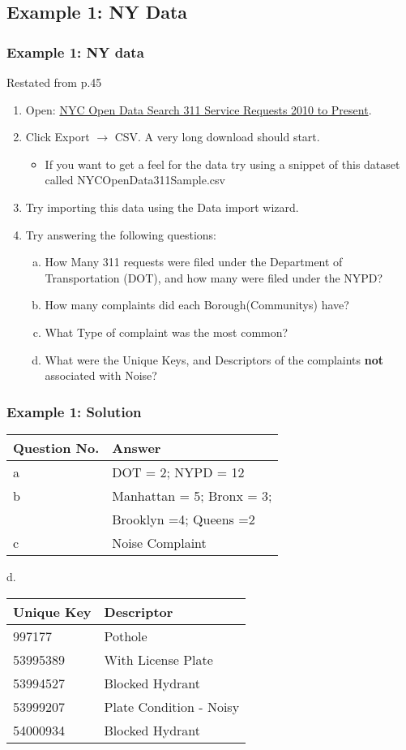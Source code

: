 \documentclass[12pt]{beamer}
\begin{document}
\subsection{Example 1: NY Data}
	\begin{frame}
		\frametitle{Example 1: NY data}
		Restated from p.45 
		\begin{enumerate}
			\item Open: \textcolor{blue}{ \href{https://data.cityofnewyork.us/Social-Services/311-Service-Requests-from-2010-to-Present/erm2-nwe9}{NYC Open Data Search 311 Service Requests 2010 to Present}}.
			\item Click Export $\rightarrow$ CSV. A very long download should start.
			\begin{itemize}
			\item If you want to get a feel for the data try using a snippet of this dataset called NYCOpenData311Sample.csv
			\end{itemize}
			\item Try importing this data using the Data import wizard.
			\item Try answering the following questions:
			\begin{enumerate}[a.]%
				\item How Many 311 requests were filed under the Department of Transportation (DOT), and how many were filed under the NYPD?
				\item How many complaints did each Borough(Communitys) have?
				\item What Type of complaint was the most common?
				\item What were the Unique Keys, and Descriptors of the complaints \textbf{not} associated with Noise?
			\end{enumerate}
		\end{enumerate}
	\end{frame}
	\begin{frame}
		\frametitle{Example 1: Solution}
		\begin{center}
			\begin{tabular}{l |l}
				Question No. & Answer \\
				\hline
				a & DOT = 2; NYPD = 12\\
				b & Manhattan = 5; Bronx = 3; \\
				& Brooklyn  =4; Queens =2  \\
				c  & Noise Complaint \\
			\end{tabular}
		\end{center}
	d. 
	\begin{center}
		\begin{tabular}{ l | l }
			Unique Key & Descriptor \\
			\hline
			997177	&	Pothole\\
			53995389 & With License Plate\\
			53994527 & Blocked Hydrant\\
			53999207 & Plate Condition - Noisy\\
			54000934 & Blocked Hydrant
		\end{tabular}
	\end{center}
	\end{frame}
\end{document}
